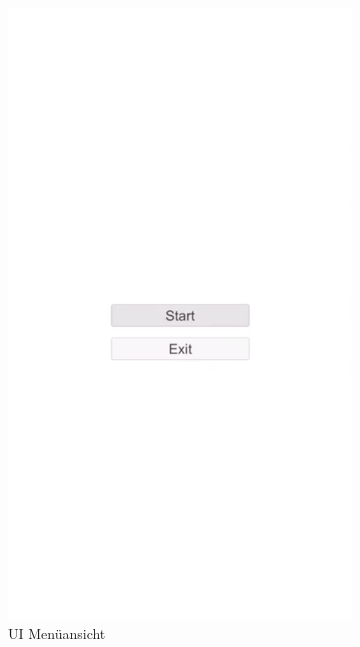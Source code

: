 \begin{figure}[H]
    \centering
    \begin{subfigure}[b]{0.3\textwidth}
        \includegraphics[width=\textwidth]{assets/uiMenu}
        \caption{UI Menüansicht}
        \label{fig:uiMenu}
    \end{subfigure}
    ~
    \begin{subfigure}[b]{0.3\textwidth}

\end{subfigure}
\end{figure}
